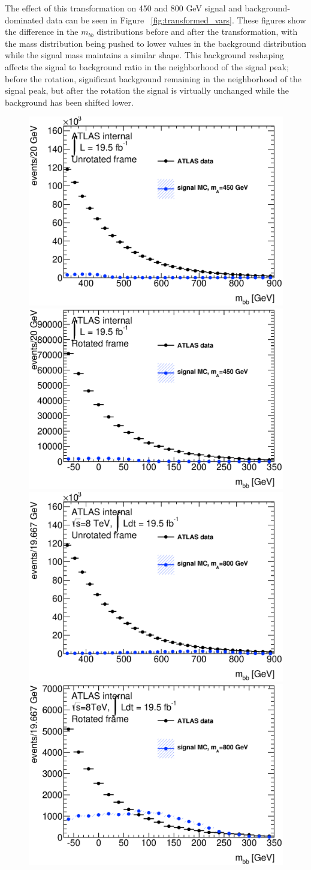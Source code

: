 The effect of this transformation on 450 and 800 GeV signal and background-dominated
data can be seen in Figure ~\ref{fig:transformed_vars}.  These figures show
the difference in the $m_{bb}$ distributions %
before and after the transformation,
with the mass distribution being pushed to lower values
in the background distribution while the signal mass maintains a similar shape.  
This background reshaping affects the signal to background ratio in the 
neighborhood of the signal peak; before the rotation,
significant background remaining in the neighborhood of the signal peak, 
but after the rotation the signal is virtually
unchanged while the background has been shifted lower.  

\begin{figure}[hbt]
\includegraphics[width=0.45\linewidth]{SignalKin/h_mass_bAbb_450_unrotated.eps}
\includegraphics[width=0.45\linewidth]{SignalKin/h_mass_bAbb_450_rotated.eps} \\
\includegraphics[width=0.45\linewidth]{SignalKin/h_mass_bAbb_800_unrotated.eps}
\includegraphics[width=0.45\linewidth]{SignalKin/h_mass_bAbb_800_rotated.eps} \\

\end{figure}
